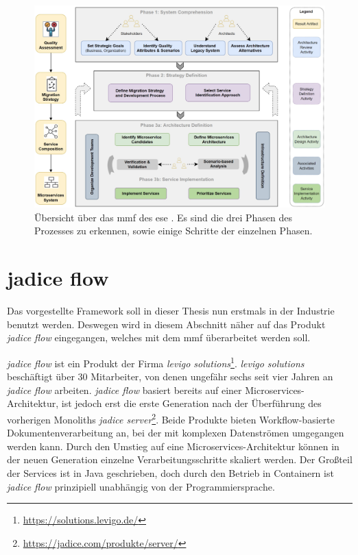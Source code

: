 \begin{figure}
	\centering
	\includegraphics[width=\textwidth]{figures/mmf-overview}
	\caption[\acrfull{mmf} Übersicht]{
		Übersicht über das \gls{mmf} des \gls{ese} \cite{fritzsch2022architecturecentric}. Es sind die drei Phasen des Prozesses zu erkennen, sowie einige Schritte der einzelnen Phasen.
	}
	\label{fig:mmf-overview}
\end{figure}

\section{jadice flow}

Das vorgestellte Framework soll in dieser Thesis nun erstmals in der Industrie benutzt werden.
Deswegen wird in diesem Abschnitt näher auf das Produkt \emph{jadice flow} eingegangen, welches mit dem \gls{mmf} überarbeitet werden soll.

\emph{jadice flow} ist ein Produkt der Firma \emph{levigo solutions}\footnote{\url{https://solutions.levigo.de/}}.
\emph{levigo solutions} beschäftigt über 30 Mitarbeiter, von denen ungefähr sechs seit vier Jahren an \emph{jadice flow} arbeiten.
\emph{jadice flow} basiert bereits auf einer Microservices-Architektur, ist jedoch erst die erste Generation nach der Überführung des vorherigen Monoliths \emph{jadice server}\footnote{\url{https://jadice.com/produkte/server/}}.
Beide Produkte bieten Workflow-basierte Dokumentenverarbeitung an, bei der mit komplexen Datenströmen umgegangen werden kann.
Durch den Umstieg auf eine Microservices-Architektur können in der neuen Generation einzelne Verarbeitungsschritte skaliert werden.
Der Großteil der Services ist in Java geschrieben, doch durch den Betrieb in Containern ist \emph{jadice flow} prinzipiell unabhängig von der Programmiersprache.

